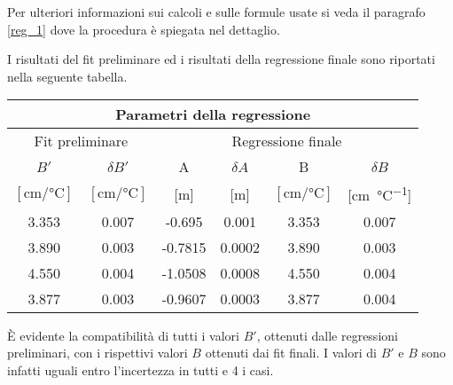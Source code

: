 Per ulteriori informazioni sui calcoli e sulle formule usate si veda il paragrafo \ref{reg_1} dove la procedura è spiegata
nel dettaglio.

I risultati del fit preliminare ed i risultati della regressione finale sono riportati nella seguente tabella.

\begin{center}
    \begin{tabular}{c c | c c c c}
        \multicolumn{6}{c}{\textbf{Parametri della regressione}} \\
        \toprule
        \multicolumn{2}{c|}{Fit preliminare} & \multicolumn{4}{c}{Regressione finale} \\
        \midrule
        $B'$ & $\delta B'$ & A & $\delta A$ & B & $\delta B$ \\
        $[\si{\centi\meter\per\celsius}]$ & $[\si{\centi\meter\per\celsius}]$ &
        [m] & [m] & $[\si{\centi\meter\per\celsius}]$ & [\si{\centi\metre\per\celsius}] \\
        \midrule
        3.353 & 0.007 & -0.695  & 0.001 & 3.353 & 0.007 \\
        3.890 & 0.003 & -0.7815 & 0.0002 & 3.890 & 0.003 \\
        4.550 & 0.004 & -1.0508 & 0.0008 & 4.550 & 0.004 \\
        3.877 & 0.003 & -0.9607 & 0.0003 & 3.877 & 0.004 \\
        \bottomrule
    \end{tabular}
\end{center}

È evidente la compatibilità di tutti i valori $B'$, ottenuti dalle regressioni preliminari, con i rispettivi valori $B$ ottenuti dai
fit finali. I valori di $B'$ e $B$ sono infatti uguali entro l'incertezza in tutti e 4 i casi.
